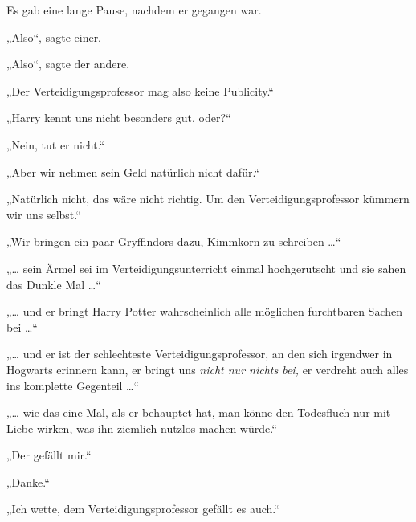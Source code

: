 Es gab eine lange Pause, nachdem er gegangen war.

„Also“, sagte einer.

„Also“, sagte der andere.

„Der Verteidigungsprofessor mag also keine Publicity.“

„Harry kennt uns nicht besonders gut, oder?“

„Nein, tut er nicht.“

„Aber wir nehmen sein Geld natürlich nicht dafür.“

„Natürlich nicht, das wäre nicht richtig. Um den Verteidigungsprofessor kümmern wir uns selbst.“

„Wir bringen ein paar Gryffindors dazu, Kimmkorn zu schreiben …“

„… sein Ärmel sei im Verteidigungsunterricht einmal hochgerutscht und sie sahen das Dunkle Mal …“

„… und er bringt Harry Potter wahrscheinlich alle möglichen furchtbaren Sachen bei …“

„… und er ist der schlechteste Verteidigungsprofessor, an den sich irgendwer in Hogwarts erinnern kann, er bringt uns \emph{nicht nur nichts bei,} er verdreht auch alles ins komplette Gegenteil …“

„… wie das eine Mal, als er behauptet hat, man könne den Todesfluch nur mit Liebe wirken, was ihn ziemlich nutzlos machen würde.“

„Der gefällt mir.“

„Danke.“

„Ich wette, dem Verteidigungsprofessor gefällt es auch.“

